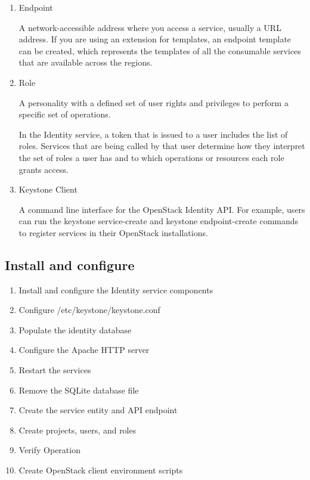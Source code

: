 \begin{enumerate}
        \item Endpoint
        \par A network-accessible address where you access a service, usually a URL address. If you are using an extension for templates, an endpoint template can be created, which represents the templates of all the consumable services that are available across the regions.
        
        \item Role
        \par A personality with a defined set of user rights and privileges to perform a specific set of operations.
        
        \par In the Identity service, a token that is issued to a user includes the list of roles. Services that are being called by that user determine how they interpret the set of roles a user has and to which operations or resources each role grants access.
        
        \item Keystone Client
        \par A command line interface for the OpenStack Identity API. For example, users can run the keystone service-create and keystone endpoint-create commands to register services in their OpenStack installations.

    \end{enumerate}
    
    \subsection{Install and configure}
        \begin{enumerate}
            \item Install and configure the Identity service components
            \item Configure /etc/keystone/keystone.conf
            \item Populate the identity database
            \item Configure the Apache HTTP server
            \item Restart the services
            \item Remove the SQLite database file
            \item Create the service entity and API endpoint
            \item Create projects, users, and roles
            \item Verify Operation
            \item Create OpenStack client environment scripts
        \end{enumerate}
    
